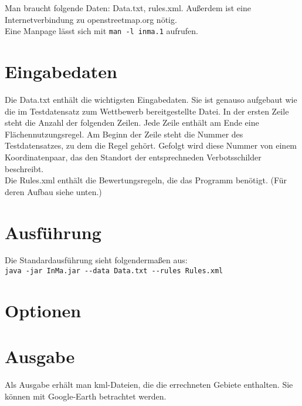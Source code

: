 Man braucht folgende Daten: Data.txt, rules.xml. Außerdem ist eine Internetverbindung zu openstreetmap.org nötig.\\
Eine Manpage lässt sich mit \verb|man -l inma.1| aufrufen.
\section{Eingabedaten}
Die Data.txt enthält die wichtigsten Eingabedaten. Sie ist genauso aufgebaut wie die im Testdatensatz zum Wettbewerb bereitgestellte Datei.
In der ersten Zeile steht die Anzahl der folgenden Zeilen. Jede Zeile enthält am Ende eine Flächennutzungsregel. Am Beginn der Zeile steht
die Nummer des Testdatensatzes, zu dem die Regel gehört. Gefolgt wird diese Nummer von einem Koordinatenpaar, das den Standort der
entsprechneden Verbotsschilder beschreibt.\\
Die Rules.xml enthält die Bewertungsregeln, die das Programm benötigt. (Für deren Aufbau siehe unten.)
\section{Ausführung}
Die Standardausführung sieht folgendermaßen aus:\\
\verb|java -jar InMa.jar --data Data.txt --rules Rules.xml|
\section{Optionen}
\section{Ausgabe}
Als Ausgabe erhält man kml-Dateien, die die errechneten Gebiete enthalten. Sie können mit Google-Earth betrachtet werden.
